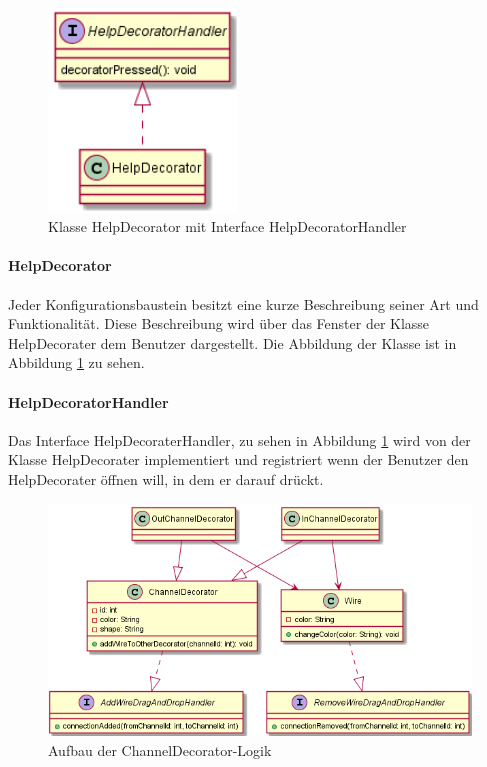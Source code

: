 \documentclass[parskip=full]{scrartcl}
\begin{document}
\begin{figure}[htbp]
	\begin{center}
		\includegraphics[width = 5cm]{Grafiken/View/HelpDecorator.PNG}
		\caption{Klasse HelpDecorator mit Interface HelpDecoratorHandler}
		\label{Help}
	\end{center}
\end{figure}

\paragraph{HelpDecorator}

Jeder Konfigurationsbaustein besitzt eine kurze Beschreibung seiner Art und Funktionalität. Diese Beschreibung wird über das Fenster der Klasse HelpDecorater dem Benutzer dargestellt. Die Abbildung der Klasse ist in Abbildung \ref{Help} zu sehen.

\paragraph{HelpDecoratorHandler}

Das Interface HelpDecoraterHandler, zu sehen in Abbildung \ref{Help} wird von der Klasse HelpDecorater implementiert und registriert wenn der Benutzer den HelpDecorater öffnen will, in dem er darauf drückt.

\begin{figure}[htbp]
	\begin{center}
		\includegraphics[width = 13cm]{Grafiken/View/ChannelDecorator.PNG}
		\caption{Aufbau der ChannelDecorator-Logik}
		\label{ChannelDecorator}
	\end{center}
\end{figure}
\end{document}
